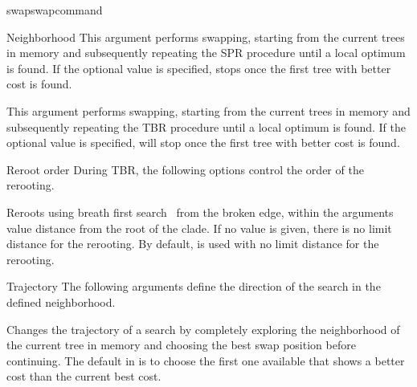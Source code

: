 \begin{command}{swap}{swapcommand}
\begin{arguments}
\begin{argumentgroup}{Neighborhood}
                {This argument performs  swapping, starting
                from the current trees in memory and subsequently repeating
                the SPR procedure until  a local optimum is found. If the optional value
                 is specified,  
                stops once the first tree with better cost is found.} 
                {}

                {This argument performs  swapping, starting
                from the current trees in memory and subsequently repeating
                the TBR procedure until  a local optimum is found.  If the optional value
                 is specified,  
                will stop once the first tree with better cost is found.}
                {}

        \end{argumentgroup}

        \begin{argumentgroup}{Reroot order}
            {During TBR, the following options control the order of the rerooting.}

                {Reroots using breath first search~\cite{cormen2001} from the broken edge, within the
                arguments value distance from the root of the clade. If no value is
                given, there is no limit distance for the rerooting. By default, 
                is used with no limit distance for the rerooting.}
                {}

        \end{argumentgroup}

        \begin{argumentgroup}{Trajectory}
            {The following arguments define the direction of the search in the defined
            neighborhood.}

                {Changes the trajectory of a search by
                completely exploring the neighborhood of the current
                tree in memory and choosing the best swap position
                before continuing.
                The default in \poy is to choose the first one
                available that shows a better cost than the current
                best cost.}
                {}


\end{argumentgroup}
\end{arguments}
\end{command}
